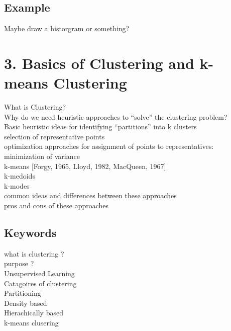 \documentclass[a4paper,10pt,titlepage]{report}
\begin{document}
	
\subsection{Example}
Maybe draw a historgram or something?



\newpage
\section{3.	Basics of Clustering and k-means Clustering}
	What is Clustering? \\
	Why do we need heuristic approaches to “solve” the clustering problem? \\
	Basic heuristic ideas for identifying “partitions” into k clusters \\
\hspace{10mm}		selection of representative points \\
\hspace{10mm}		optimization approaches for assignment of points to  representatives: \\
\hspace{10mm}			minimization of variance \\
\hspace{15mm}			k-means [Forgy, 1965, Lloyd, 1982, MacQueen, 1967] \\
\hspace{15mm}			k-medoids\\
\hspace{15mm}			k-modes\\
	common ideas and differences between these approaches\\
	pros and cons of these approaches\\
	
\subsection{Keywords}
\hspace{10mm} what is clustering ? \\
\hspace{10mm} purpose ? \\
\hspace{10mm} Unsupervised Learning \\
\hspace{10mm} Catagoires of clustering \\
\hspace{15mm} Partitioning \\
\hspace{15mm} Density based \\
\hspace{15mm} Hierachically based \\
\hspace{10mm} k-means clusering \\
\end{document}
